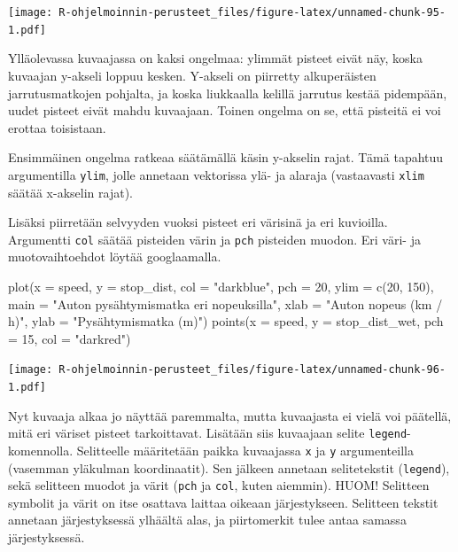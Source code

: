 \documentclass[
]{book}
\newenvironment{Shaded}{\begin{snugshade}}{\end{snugshade}}
\newcommand{\AttributeTok}[1]{\textcolor[rgb]{0.77,0.63,0.00}{#1}}
\newcommand{\DecValTok}[1]{\textcolor[rgb]{0.00,0.00,0.81}{#1}}
\newcommand{\FunctionTok}[1]{\textcolor[rgb]{0.00,0.00,0.00}{#1}}
\newcommand{\NormalTok}[1]{#1}
\newcommand{\StringTok}[1]{\textcolor[rgb]{0.31,0.60,0.02}{#1}}
\begin{document}
\texttt{[image: R-ohjelmoinnin-perusteet\_files/figure-latex/unnamed-chunk-95-1.pdf]}

Ylläolevassa kuvaajassa on kaksi ongelmaa: ylimmät pisteet eivät näy, koska kuvaajan y-akseli loppuu kesken. Y-akseli on piirretty alkuperäisten jarrutusmatkojen pohjalta, ja koska liukkaalla kelillä jarrutus kestää pidempään, uudet pisteet eivät mahdu kuvaajaan. Toinen ongelma on se, että pisteitä ei voi erottaa toisistaan.

Ensimmäinen ongelma ratkeaa säätämällä käsin y-akselin rajat. Tämä tapahtuu argumentilla \texttt{ylim}, jolle annetaan vektorissa ylä- ja alaraja (vastaavasti \texttt{xlim} säätää x-akselin rajat).

Lisäksi piirretään selvyyden vuoksi pisteet eri värisinä ja eri kuvioilla. Argumentti \texttt{col} säätää pisteiden värin ja \texttt{pch} pisteiden muodon. Eri väri- ja muotovaihtoehdot löytää googlaamalla.

\begin{Shaded}
\begin{Highlighting}[]
\FunctionTok{plot}\NormalTok{(}\AttributeTok{x =}\NormalTok{ speed, }\AttributeTok{y =}\NormalTok{ stop\_dist,}
     \AttributeTok{col =} \StringTok{"darkblue"}\NormalTok{, }\AttributeTok{pch =} \DecValTok{20}\NormalTok{,}
     \AttributeTok{ylim =} \FunctionTok{c}\NormalTok{(}\DecValTok{20}\NormalTok{, }\DecValTok{150}\NormalTok{),}
     \AttributeTok{main =} \StringTok{"Auton pysähtymismatka eri nopeuksilla"}\NormalTok{,}
     \AttributeTok{xlab =} \StringTok{"Auton nopeus (km / h)"}\NormalTok{, }\AttributeTok{ylab =} \StringTok{"Pysähtymismatka (m)"}\NormalTok{)}
\FunctionTok{points}\NormalTok{(}\AttributeTok{x =}\NormalTok{ speed, }\AttributeTok{y =}\NormalTok{ stop\_dist\_wet, }\AttributeTok{pch =} \DecValTok{15}\NormalTok{, }\AttributeTok{col =} \StringTok{"darkred"}\NormalTok{)}
\end{Highlighting}
\end{Shaded}

\texttt{[image: R-ohjelmoinnin-perusteet\_files/figure-latex/unnamed-chunk-96-1.pdf]}

Nyt kuvaaja alkaa jo näyttää paremmalta, mutta kuvaajasta ei vielä voi päätellä, mitä eri väriset pisteet tarkoittavat. Lisätään siis kuvaajaan selite \texttt{legend}-komennolla. Selitteelle määritetään paikka kuvaajassa \texttt{x} ja \texttt{y} argumenteilla (vasemman yläkulman koordinaatit). Sen jälkeen annetaan selitetekstit (\texttt{legend}), sekä selitteen muodot ja värit (\texttt{pch} ja \texttt{col}, kuten aiemmin). HUOM! Selitteen symbolit ja värit on itse osattava laittaa oikeaan järjestykseen. Selitteen tekstit annetaan järjestyksessä ylhäältä alas, ja piirtomerkit tulee antaa samassa järjestyksessä.
\end{document}
